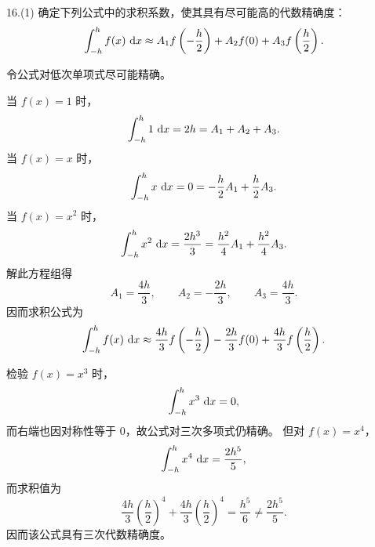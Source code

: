 \documentclass[11pt, a4paper]{ctexart}
\begin{document}
\begin{problem}{16.(1) 确定下列公式中的求积系数，使其具有尽可能高的代数精确度：}
    \[
        \int_{-h}^{h}f(x)\,\,\mathrm{d} x \approx A_1f\left(-\frac{h}{2}\right)+A_2f(0)+A_3f\left(\frac{h}{2}\right).
    \]
\end{problem}

\begin{solution}
    令公式对低次单项式尽可能精确。

    当 $f(x)=1$ 时，
    \[
        \int_{-h}^{h}1\,\,\mathrm{d} x=2h=A_1+A_2+A_3.
    \]
    当 $f(x)=x$ 时，
    \[
        \int_{-h}^{h}x\,\,\mathrm{d} x=0=-\frac{h}{2}A_1+\frac{h}{2}A_3.
    \]
    当 $f(x)=x^2$ 时，
    \[
        \int_{-h}^{h}x^2\,\,\mathrm{d} x=\frac{2h^3}{3}=\frac{h^2}{4}A_1+\frac{h^2}{4}A_3.
    \]
    解此方程组得
    \[
        A_1=\frac{4h}{3},\qquad
        A_2=-\frac{2h}{3},\qquad
        A_3=\frac{4h}{3}.
    \]
    因而求积公式为
    \[
        \int_{-h}^{h}f(x)\,\,\mathrm{d} x
        \approx
        \frac{4h}{3}f\left(-\frac{h}{2}\right)
        -\frac{2h}{3}f(0)
        +\frac{4h}{3}f\left(\frac{h}{2}\right).
    \]

    检验 $f(x)=x^3$ 时，
    \[
        \int_{-h}^{h}x^3\,\,\mathrm{d} x=0,
    \]
    而右端也因对称性等于 $0$，故公式对三次多项式仍精确。
    但对 $f(x)=x^4$，
    \[
        \int_{-h}^{h}x^4\,\,\mathrm{d} x=\frac{2h^5}{5},
    \]
    而求积值为
    \[
        \frac{4h}{3}\left(\frac{h}{2}\right)^4+\frac{4h}{3}\left(\frac{h}{2}\right)^4=\frac{h^5}{6}\neq \frac{2h^5}{5}.
    \]
    因而该公式具有三次代数精确度。
\end{solution}
\end{document}
